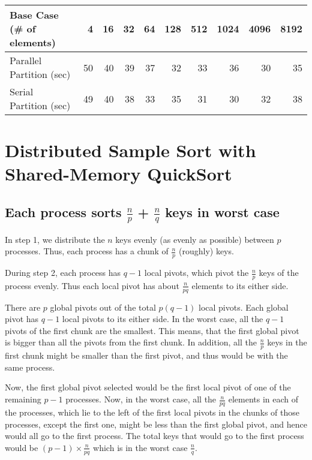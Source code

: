 \documentclass{article}
\begin{document}
\begin{center}
  \begin{tabular}{| l | r | r | r | r | r | r | r | r | r |}
    \hline
    Base Case (\# of elements) & 4 & 16 & 32 & 64 & 128 & 512 & 1024 & 4096 & 8192 \\ \hline
    Parallel Partition (sec) & 50 & 40 & 39 & 37 & 32 & 33 & 36 & 30 & 35 \\ \hline
    Serial Partition (sec) & 49 & 40 & 38 & 33 & 35 & 31 & 30 & 32 & 38 \\ \hline
  \end{tabular}
\end{center}


\section{Distributed Sample Sort with Shared-Memory QuickSort}

\subsection{Each process sorts $\frac{n}{p}$ + $\frac{n}{q}$ keys in worst case}
In step 1, we distribute the $n$ keys evenly 
(as evenly as possible) between $p$ processes. Thus, each 
process has a chunk of $\frac{n}{p}$ (roughly) keys.

During step 2, each process has $q-1$ local pivots, which pivot 
the $\frac{n}{p}$ keys of the process evenly. Thus each local 
pivot has about $\frac{n}{pq}$ elements to its either side. 

There are $p$ global pivots out of the total $p(q-1)$ local pivots.
Each global pivot has $q-1$ local pivots to its either side. In
the worst case, all the $q-1$ pivots of the first chunk are the
smallest. This means, that the first global pivot is bigger than
all the pivots from the first chunk. In addition, all the 
$\frac{n}{p}$ keys in the first chunk might be smaller than the 
first pivot, and thus would be with the same process.

Now, the first global pivot selected would be the first local
pivot of one of the remaining $p-1$ processes. Now, in the worst
case, all the $\frac{n}{pq}$ elements in each of the processes, 
which lie to the left of the first local pivots in the chunks
of those processes,
except the first one, might be less than the first global pivot,
and hence would all go to the first process. The total keys
that would go to the first process would be $(p-1) \times 
\frac{n}{pq}$ which is in the worst case $\frac{n}{q}$.
\end{document}
